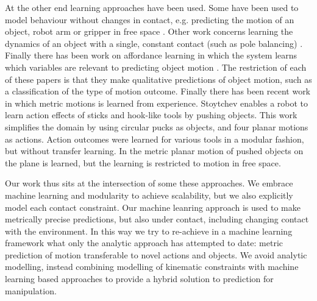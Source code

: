 At the other end learning approaches have been used. Some have been used to model behaviour without changes in contact, e.g. predicting the motion of an object, robot arm or gripper in free space \citep{Ting06,Boots14,dearden2005learning}. Other work concerns learning the dynamics of an object with a single, constant contact (such as pole balancing) \citep{Schaal97,SchaalAtkeson97}. Finally there has been work on affordance learning in which the system learns which variables are relevant to predicting object motion \citep{montesano08,moldovan12,hermans11,fitzpatrick_learning_2003,ridge2010self,kroemer2014,hermans13}. The restriction of each of these papers is that they make qualitative predictions of object motion, such as a classification of the type of motion outcome. Finally there has been recent work in which metric motions is learned from experience. Stoytchev \citep{Stoytchev_affordances_2008} enables a robot to learn action effects of sticks and hook-like tools by pushing objects. This work simplifies the domain by using circular pucks as objects, and four planar motions as actions. Action outcomes were learned for various tools in a modular fashion, but without transfer learning.  In \citep{mericli2014} the metric planar motion of pushed objects on the plane is learned, but the learning is restricted to motion in free space. 

Our work thus sits at the intersection of some these approaches. We embrace machine learning and modularity to achieve scalability, but we also explicitly model each contact constraint. Our machine leanring approach is used to make metrically precise predictions, but also under contact, including changing contact with the environment. In this way we try to re-achieve in a machine learning framework what only the analytic approach has attempted to date: metric prediction of motion transferable to novel actions and objects. We avoid analytic modelling, instead combining modelling of kinematic constraints with machine learning based approaches to provide a hybrid solution to prediction for manipulation.